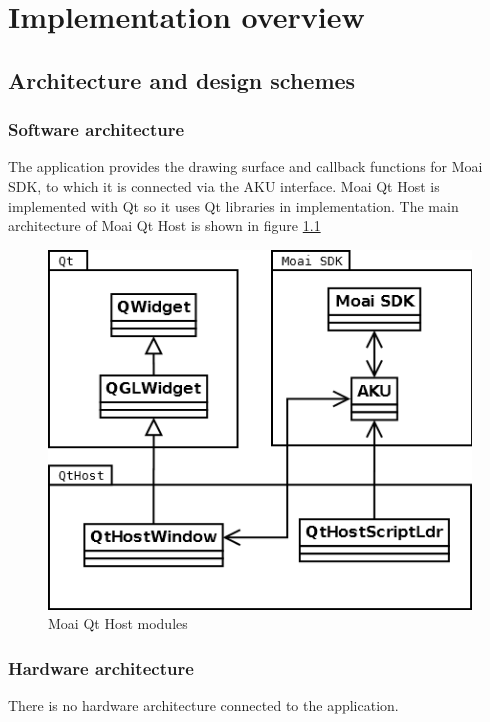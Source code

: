 \chapter{Implementation overview}

\section{Architecture and design schemes}

\subsection{Software architecture}

The application provides the drawing surface and callback functions for Moai SDK, to which it is connected via the AKU interface.
Moai Qt Host is implemented with Qt so it uses Qt libraries in implementation. The main architecture of Moai Qt Host is shown in figure \ref{fig:modules}

\begin{figure}[h]
	\begin{center}
	\includegraphics[scale=0.6]{images/moai_qt_host_modules.png}
	\caption{Moai Qt Host modules\label{fig:modules}}
	\end{center}
\end{figure}

\subsection{Hardware architecture}

There is no hardware architecture connected to the application.

